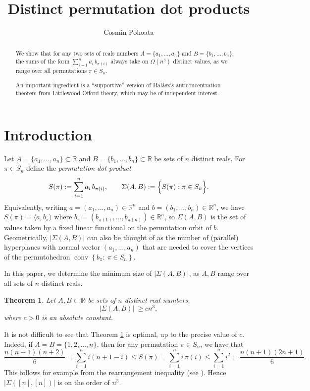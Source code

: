 \documentclass[12pt]{amsart}
\title{Distinct permutation dot products}
\author{Cosmin Pohoata}
\date{}
\newtheorem{theorem}{Theorem}[section]
\theoremstyle{definition}
\theoremstyle{remark}
\newcommand{\RR}{\mathbb{R}}
\newcommand{\abs}[1]{\left|#1\right|}
\newcommand{\bigset}[1]{\Bigl\{#1\Bigr\}}
\newcommand{\Sig}{\Sigma}
\begin{document}
\maketitle

\begin{abstract}
We show that for any two sets of reals numbers $A=\{a_1,\dots,a_n\}$ and $B=\{b_1,\dots,b_n\}$, the sums of the form $\sum_{i=1}^n a_i\,b_{\pi(i)}$ always take on $\Omega(n^{3})$ distinct values, as we range over all permutations $\pi \in S_n$.

An important ingredient is a ``supportive'' version of Hal\'asz's anticoncentration theorem from Littlewood-Offord theory, which may be of independent interest. 
\end{abstract}

\section{Introduction} \label{sec:intro}

Let $A=\{a_1,\dots,a_n\}\subset\RR$ and $B=\{b_1,\dots,b_n\}\subset\RR$ be sets of $n$ distinct reals.
For $\pi\in S_n$ define the \emph{permutation dot product}
\[
S(\pi):=\sum_{i=1}^n a_i\,b_{\pi(i)},
\qquad
\Sig(A,B):=\bigset{S(\pi):\pi\in S_n}.
\]
Equivalently, writing $a=(a_1,\dots,a_n) \in \mathbb{R}^{n}$ and $b=(b_1,\dots,b_n) \in \mathbb{R}^{n}$, we have
$S(\pi)=\langle a, b_\pi\rangle$ where $b_\pi=(b_{\pi(1)},\dots,b_{\pi(n)}) \in \mathbb{R}^{n}$, so $\Sig(A,B)$ is the
set of values taken by a fixed linear functional on the permutation orbit of $b$. Geometrically, $|\Sig(A,B)|$ can also be thought of as the number of (parallel) hyperplanes with normal vector $(a_1,\ldots,a_n)$ that are needed to cover the vertices of the permutohedron $\operatorname{conv}\left\{b_{\pi}:\ \pi \in S_n\right\}$. 

In this paper, we determine the minimum size of $\abs{\Sig(A,B)}$, as $A,B$ range over all sets of $n$ distinct reals. 

\begin{theorem}\label{thm:main}
Let $A,B\subset\RR$ be sets of $n$ distinct real numbers. 
\[
\abs{\Sig(A,B)}\ \geq cn^{3},
\]
where $c >0$ is an absolute constant.
\end{theorem}

It is not difficult to see that Theorem \ref{thm:main} is optimal, up to the precise value of $c$. Indeed, if $A=B=\{1,2,\dots,n\}$, then for any permutation $\pi \in S_n$, we have that
$$\frac{n(n+1)(n+2)}{6} =\sum_{i=1}^{n} i(n+1-i) \leq S(\pi)=\sum_{i=1}^n i\,\pi(i) \leq \sum_{i=1}^{n}{i^2} = \frac{n(n+1)(2n+1)}{6}.$$
This follows for example from the rearrangement inequality (see \cite{HLP52}). Hence $\abs{\Sigma([n],[n])}$ is on the order of $n^3$. 
\end{document}
